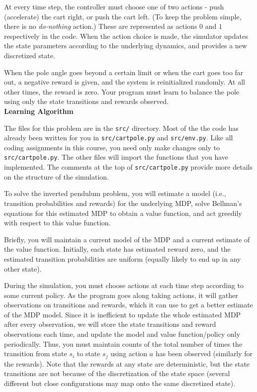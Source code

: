 At every time step, the controller must choose one of two actions -
push (accelerate) the cart right, or push the cart left.
(To keep the problem simple, there is no {\it do-nothing} action.)
These are represented as actions $0$ and $1$ respectively in the code.  
When the action choice is made, the simulator updates the state parameters 
according to the underlying dynamics, and provides a new discretized state.

When the pole angle goes beyond a certain limit or when the cart goes
too far out, a negative reward is given, and the system is reinitialized 
randomly. At all other times, the reward is zero.  Your program must learn 
to balance the pole using only the state transitions and rewards observed.\\

\textbf{Learning Algorithm}

The files for this problem are in the {\tt src/} directory.
Most of the the code has already been written for you in {\tt src/cartpole.py}
and {\tt src/env.py}.  Like all coding assignments in this course, you need only
make changes only to {\tt src/cartpole.py}. The other files will import the
functions that you have implemented.  The comments at the top of
{\tt src/cartpole.py} provide more details on the structure of the simulation.

To solve the inverted pendulum problem, you will estimate a 
model (i.e., transition probabilities and rewards) for the underlying 
MDP, solve Bellman's equations for this estimated MDP to obtain
a value function, and act greedily with respect to this value function.  

Briefly, you will maintain a current model of the MDP and a current
estimate of the value function. Initially, each state has estimated reward zero,
and the estimated transition probabilities are uniform (equally likely 
to end up in any other state).

During the simulation, you must choose actions at each time step 
according to some current policy.  As the program goes along taking 
actions, it will gather observations on transitions and rewards,
which it can use to get a better estimate of the MDP model.
Since it is inefficient to update the whole estimated MDP after every 
observation, we will store the state transitions and reward observations 
each time, and update the model and value function/policy only periodically. 
Thus, you must maintain counts of the total number of times the 
transition from state $s_i$ to state $s_j$ using action $a$ has been 
observed (similarly for the rewards).  Note that the rewards at 
any state are deterministic, but the state transitions are not because 
of the discretization of the state space (several different but close
configurations may map onto the same discretized state).

